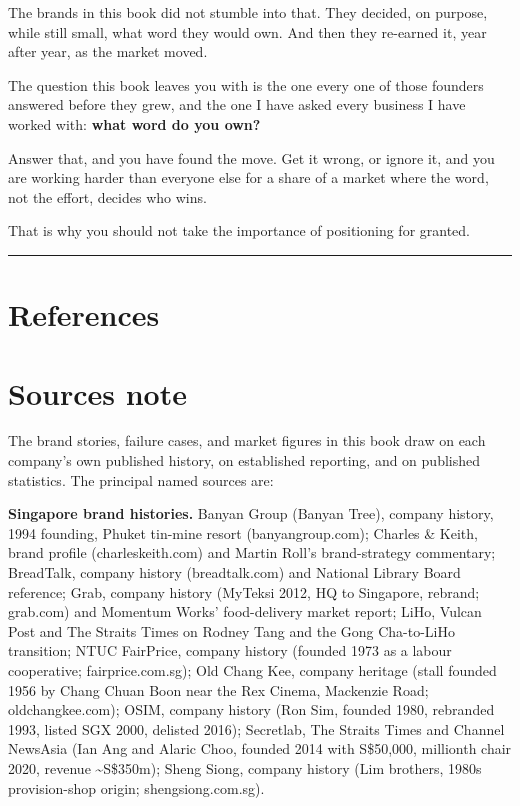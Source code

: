 \documentclass[10pt,twoside,openany]{memoir}
\newcommand{\needspacehead}{\needspace{4\baselineskip}}
\let\oldsection\section
\renewcommand{\section}{\needspacehead\oldsection}
\begin{document}
{{{{{The brands in this book did not stumble into that. They decided, on
purpose, while still small, what word they would own. And then they
re-earned it, year after year, as the market moved.

The question this book leaves you with is the one every one of those
founders answered before they grew, and the one I have asked every
business I have worked with: \textbf{what word do you own?}

Answer that, and you have found the move. Get it wrong, or ignore it,
and you are working harder than everyone else for a share of a market
where the word, not the effort, decides who wins.

That is why you should not take the importance of positioning for
granted.

\begin{center}\rule{0.5\linewidth}{0.5pt}\end{center}

\backmatter
\section*{References}\label{references}

\nocite{*}


\section{Sources note}\label{sources-note}

The brand stories, failure cases, and market figures in this book draw
on each company's own published history, on established reporting, and
on published statistics. The principal named sources are:

\textbf{Singapore brand histories.} Banyan Group (Banyan Tree), company
history, 1994 founding, Phuket tin-mine resort (banyangroup.com);
Charles \& Keith, brand profile (charleskeith.com) and Martin Roll's
brand-strategy commentary; BreadTalk, company history (breadtalk.com)
and National Library Board reference; Grab, company history (MyTeksi
2012, HQ to Singapore, rebrand; grab.com) and Momentum Works'
food-delivery market report; LiHo, Vulcan Post and The Straits Times on
Rodney Tang and the Gong Cha-to-LiHo transition; NTUC FairPrice, company
history (founded 1973 as a labour cooperative; fairprice.com.sg); Old
Chang Kee, company heritage (stall founded 1956 by Chang Chuan Boon near
the Rex Cinema, Mackenzie Road; oldchangkee.com); OSIM, company history
(Ron Sim, founded 1980, rebranded 1993, listed SGX 2000, delisted 2016);
Secretlab, The Straits Times and Channel NewsAsia (Ian Ang and Alaric
Choo, founded 2014 with S\$50,000, millionth chair 2020, revenue
\textasciitilde S\$350m); Sheng Siong, company history (Lim brothers,
1980s provision-shop origin; shengsiong.com.sg).

}}}}}
\end{document}
